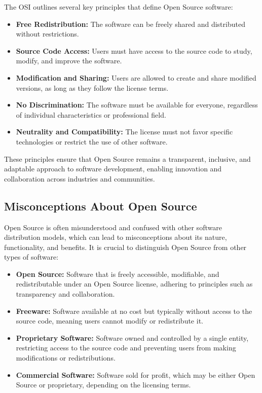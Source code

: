 The OSI outlines several key principles that define Open Source software:

\begin{itemize}
    \item \textbf{Free Redistribution:} The software can be freely shared and distributed without restrictions.
    \item \textbf{Source Code Access:} Users must have access to the source code to study, modify, and improve the software.
    \item \textbf{Modification and Sharing:} Users are allowed to create and share modified versions, as long as they follow the license terms.
    \item \textbf{No Discrimination:} The software must be available for everyone, regardless of individual characteristics or professional field.
    \item \textbf{Neutrality and Compatibility:} The license must not favor specific technologies or restrict the use of other software.
\end{itemize}

These principles ensure that Open Source remains a transparent, inclusive, and adaptable approach to software development, enabling innovation and collaboration across industries and communities.

\cite{Open_Source_Initiative_OS_definition}

\subsection{Misconceptions About Open Source}

Open Source is often misunderstood and confused with other software distribution models, which can lead to misconceptions about its nature, functionality, and benefits. 
It is crucial to distinguish Open Source from other types of software:

\begin{itemize}
    \item \textbf{Open Source:} Software that is freely accessible, modifiable, and redistributable under an Open Source license, adhering to principles such as transparency and collaboration.
    \item \textbf{Freeware:} Software available at no cost but typically without access to the source code, meaning users cannot modify or redistribute it.
    \item \textbf{Proprietary Software:} Software owned and controlled by a single entity, restricting access to the source code and preventing users from making modifications or redistributions.
    \item \textbf{Commercial Software:} Software sold for profit, which may be either Open Source or proprietary, depending on the licensing terms.
\end{itemize}

